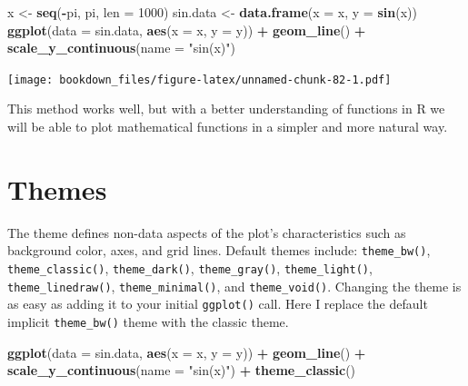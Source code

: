 \documentclass[
]{krantz}
\makeatletter
\newenvironment{Shaded}{\begin{snugshade}}{\end{snugshade}}
\newcommand{\DataTypeTok}[1]{\textcolor[rgb]{0.27,0.27,0.27}{#1}}
\newcommand{\DecValTok}[1]{\textcolor[rgb]{0.06,0.06,0.06}{#1}}
\newcommand{\KeywordTok}[1]{\textcolor[rgb]{0.27,0.27,0.27}{\textbf{#1}}}
\newcommand{\NormalTok}[1]{#1}
\newcommand{\OperatorTok}[1]{\textcolor[rgb]{0.43,0.43,0.43}{\textbf{#1}}}
\newcommand{\StringTok}[1]{\textcolor[rgb]{0.5,0.5,0.5}{#1}}
\newenvironment{kframe}{%
\medskip{}
\setlength{\fboxsep}{.8em}
 \def\at@end@of@kframe{}%
 \ifinner\ifhmode%
  \def\at@end@of@kframe{\end{minipage}}%
  \begin{minipage}{\columnwidth}%
 \fi\fi%
 \def\FrameCommand##1{\hskip\@totalleftmargin \hskip-\fboxsep
 \colorbox{shadecolor}{##1}\hskip-\fboxsep
     \hskip-\linewidth \hskip-\@totalleftmargin \hskip\columnwidth}%
 \MakeFramed {\advance\hsize-\width
   \@totalleftmargin\z@ \linewidth\hsize
   \@setminipage}}%
 {\par\unskip\endMakeFramed%
 \at@end@of@kframe}
\renewenvironment{Shaded}{\begin{kframe}}{\end{kframe}}
\makeatother
\begin{document}
\begin{Shaded}
\begin{Highlighting}[]
\NormalTok{x \textless{}{-}}\StringTok{ }\KeywordTok{seq}\NormalTok{(}\OperatorTok{{-}}\NormalTok{pi, pi, }\DataTypeTok{len =} \DecValTok{1000}\NormalTok{)}
\NormalTok{sin.data \textless{}{-}}\StringTok{ }\KeywordTok{data.frame}\NormalTok{(}\DataTypeTok{x =}\NormalTok{ x, }\DataTypeTok{y =} \KeywordTok{sin}\NormalTok{(x))}
\KeywordTok{ggplot}\NormalTok{(}\DataTypeTok{data =}\NormalTok{ sin.data, }\KeywordTok{aes}\NormalTok{(}\DataTypeTok{x =}\NormalTok{ x, }\DataTypeTok{y =}\NormalTok{ y)) }\OperatorTok{+}\StringTok{ }\KeywordTok{geom\_line}\NormalTok{() }\OperatorTok{+}\StringTok{ }
\StringTok{    }\KeywordTok{scale\_y\_continuous}\NormalTok{(}\DataTypeTok{name =} \StringTok{"sin(x)"}\NormalTok{)}
\end{Highlighting}
\end{Shaded}

\texttt{[image: bookdown\_files/figure-latex/unnamed-chunk-82-1.pdf]}

This method works well, but with a better understanding of functions in R we will be able to plot mathematical functions in a simpler and more natural way.

\hypertarget{themes}{%
\section{Themes}\label{themes}}

The theme defines non-data aspects of the plot's characteristics such as background color, axes, and grid lines. Default themes include: \texttt{theme\_bw()}, \texttt{theme\_classic()}, \texttt{theme\_dark()}, \texttt{theme\_gray()}, \texttt{theme\_light()}, \texttt{theme\_linedraw()}, \texttt{theme\_minimal()}, and \texttt{theme\_void()}. Changing the theme is as easy as adding it to your initial \texttt{ggplot()} call. Here I replace the default implicit \texttt{theme\_bw()} theme with the classic theme.

\begin{Shaded}
\begin{Highlighting}[]
\KeywordTok{ggplot}\NormalTok{(}\DataTypeTok{data =}\NormalTok{ sin.data, }\KeywordTok{aes}\NormalTok{(}\DataTypeTok{x =}\NormalTok{ x, }\DataTypeTok{y =}\NormalTok{ y)) }\OperatorTok{+}\StringTok{ }\KeywordTok{geom\_line}\NormalTok{() }\OperatorTok{+}\StringTok{ }
\StringTok{    }\KeywordTok{scale\_y\_continuous}\NormalTok{(}\DataTypeTok{name =} \StringTok{"sin(x)"}\NormalTok{) }\OperatorTok{+}
\StringTok{    }\KeywordTok{theme\_classic}\NormalTok{()}
\end{Highlighting}
\end{Shaded}
\end{document}
